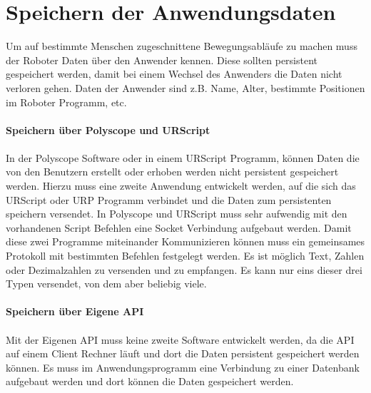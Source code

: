 \section{Speichern der Anwendungsdaten}
\label{sec:save_of_data_kon}

Um auf bestimmte Menschen zugeschnittene Bewegungsabläufe zu machen muss der Roboter Daten über den Anwender kennen. Diese sollten persistent gespeichert werden, damit bei einem Wechsel des Anwenders die Daten nicht verloren gehen.
Daten der Anwender sind z.B. Name, Alter, bestimmte Positionen im Roboter Programm, etc.
\\\\
\textbf{Speichern über Polyscope und URScript}
\label{sec:save_data_polyscope_kon}
\\\\
In der Polyscope Software oder in einem URScript Programm, können Daten die von den Benutzern erstellt oder erhoben werden nicht persistent
gespeichert werden. Hierzu muss eine zweite Anwendung entwickelt werden, auf die sich das URScript oder \ac{URP} Programm verbindet und die Daten zum persistenten speichern versendet.
In Polyscope und URScript muss sehr aufwendig mit den vorhandenen Script Befehlen eine Socket Verbindung aufgebaut werden.
Damit diese zwei Programme miteinander Kommunizieren können muss ein gemeinsames Protokoll mit bestimmten Befehlen festgelegt werden. Es ist möglich Text, Zahlen oder Dezimalzahlen zu versenden und zu empfangen. Es kann nur eins dieser drei Typen versendet, von dem aber beliebig viele. 
\\\\
\textbf{Speichern über Eigene API}
\label{save_data_own_api_kon}
\\\\
Mit der Eigenen API muss keine zweite Software entwickelt werden, da die API auf einem Client Rechner läuft und dort die Daten persistent gespeichert werden können. Es muss im Anwendungsprogramm eine Verbindung zu einer Datenbank aufgebaut werden und dort können die Daten gespeichert werden.